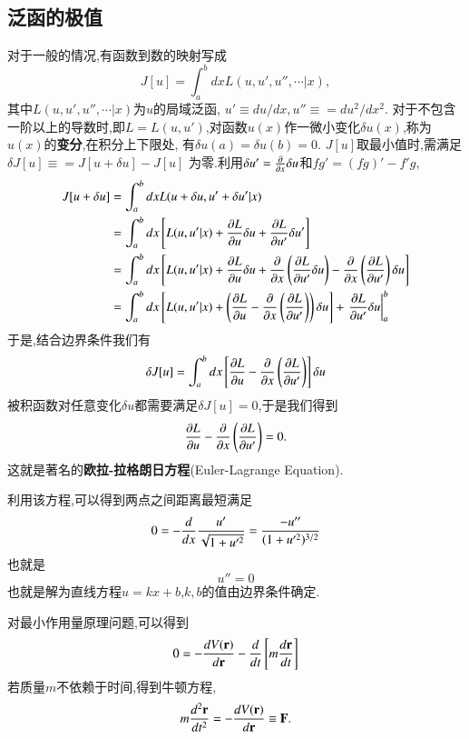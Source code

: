 \subsection{泛函的极值}

对于一般的情况,有函数到数的映射写成
\begin{equation}
  J[u] = \int_{a}^{b}  dx L(u, u', u'', \cdots| x), 
\end{equation}
其中$L(u, u', u'',\cdots | x)$为$u$的局域泛函, $u' \equiv du/dx, u'' \equiv = du^2/dx^2$.
对于不包含一阶以上的导数时,即$L = L(u,u')$,对函数$u(x)$作一微小变化$\delta u(x)$,称为$u(x)$的\textbf{变分},在积分上下限处,
有$\delta u(a) = \delta u(b) = 0$. $J[u]$取最小值时,需满足$\delta J[u] \equiv = J[u + \delta u] - J[u]$
为零.利用$\delta u' = \frac{\partial{}}{\partial{x}} \delta u$和$fg' = (fg)' - f'g$,
\begin{align}
  J[u + \delta u] &= \int_{a}^{b}  dx L(u + \delta u, u' + \delta u'| x) 
    \nonumber \\ 
    &= \int_{a}^{b} dx \left[ L(u, u'| x) + \funcpd{L}{u} \delta u + \funcpd{L}{u'} \delta u' \right]  
    \nonumber \\ 
    &= \int_{a}^{b} dx \left[ L(u, u'| x) + \funcpd{L}{u} \delta u + \funcpd{}{x}\left( \funcpd{L}{u'} \delta u \right)
    -  \funcpd{}{x}\left( \funcpd{L}{u'} \right) \delta u  \right]  
    \nonumber \\ 
    &= \int_{a}^{b} dx \left[ L(u, u'| x) + \left( \funcpd{L}{u} -  \funcpd{}{x}\left( \funcpd{L}{u'} \right)   \right) \delta u \right]  
        + \left. \funcpd{L}{u'} \delta u \right|_{a}^{b} 
     \nonumber %
\end{align}
于是,结合边界条件我们有
\begin{align}
  \delta J[u] = \int_{a}^{b} dx \left[ \frac{\partial{L}}{\partial{u}} -  \frac{\partial{}}{\partial{x}}\left( \frac{\partial{L}}{\partial{u'}} \right)   \right] \delta u 
\end{align}
被积函数对任意变化$\delta u$都需要满足$\delta J[u] = 0$,于是我们得到
\begin{equation}
  \frac{\partial{L}}{\partial{u}} -  \frac{\partial{}}{\partial{x}}\left( \frac{\partial{L}}{\partial{u'}} \right) = 0 .
\end{equation}
这就是著名的\textbf{欧拉-拉格朗日方程}(Euler-Lagrange Equation).

利用该方程,可以得到两点之间距离最短满足
$$
  0 = - \frac{d{}}{d{x}} \frac{u'}{\sqrt{1 + u'^2}} = \frac{-u''}{(1+ u'^2)^{3/2}}
$$
也就是
$$ u'' = 0$$
也就是解为直线方程$ u = k x + b$,$k,b$的值由边界条件确定.

对最小作用量原理问题,可以得到
$$
  0 = - \frac{d{V({\mathbf{r}})}}{d{{\mathbf{r}}}} - \frac{d{}}{d{t}} \left[ m \frac{d{\mathbf{r}}}{dt} \right]
$$
若质量$m$不依赖于时间,得到牛顿方程,
$$
  m \frac{d^2{\mathbf{r}}}{dt^2} = - \frac{d{V({\mathbf{r}})}}{d{{\mathbf{r}}}} \equiv {\mathbf{F}} .
$$

